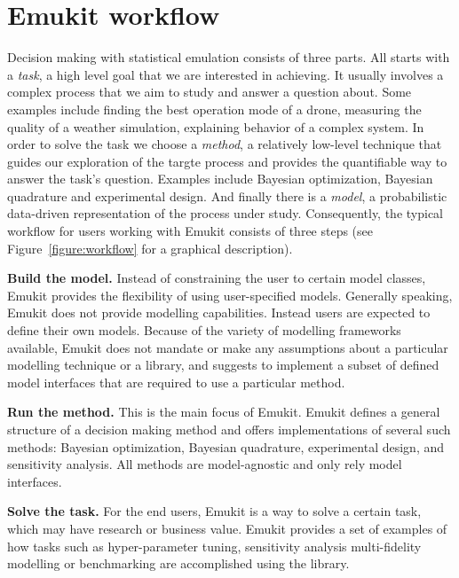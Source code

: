 \section{Emukit workflow}
Decision making with statistical emulation consists of three parts. All starts with a \textit{task}, a high level goal that we are interested in achieving. It usually involves a complex process that we aim to study and answer a question about. Some examples include finding the best operation mode of a drone, measuring the quality of a weather simulation, explaining behavior of a complex system. In order to solve the task we choose a \textit{method}, a relatively low-level technique that guides our exploration of the targte process and provides the quantifiable way to answer the task's question. Examples include Bayesian optimization, Bayesian quadrature and experimental design. And finally there is a \textit{model}, a probabilistic data-driven representation of the process under study. Consequently, the typical workflow for users working with Emukit consists of three steps (see Figure~\ref{figure:workflow} for a graphical description).

\textbf{Build the model.} Instead of constraining the user to certain model classes, Emukit provides the flexibility of using user-specified models. Generally speaking, Emukit does not provide modelling capabilities. Instead users are expected to define their own models. Because of the variety of modelling frameworks available, Emukit does not mandate or make any assumptions about a particular modelling technique or a library, and suggests to implement a subset of defined model interfaces that are required to use a particular method.

\textbf{Run the method.} This is the main focus of Emukit. Emukit defines a general structure of a decision making method and offers implementations of several such methods: Bayesian optimization, Bayesian quadrature, experimental design, and sensitivity analysis. All methods are model-agnostic and only rely model interfaces.

\textbf{Solve the task.} For the end users, Emukit is a way to solve a certain task, which may have research or business value. Emukit provides a set of examples of how tasks such as hyper-parameter tuning, sensitivity analysis multi-fidelity modelling or benchmarking are accomplished using the library.

